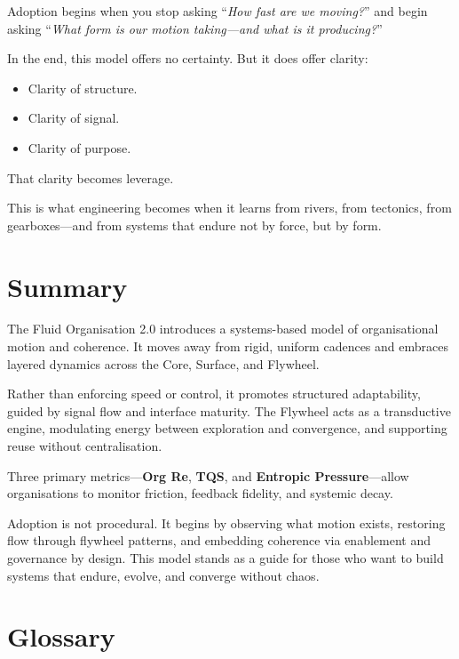 \documentclass[12pt]{article}
\begin{document}
Adoption begins when you stop asking “\textit{How fast are we moving?}” and begin asking “\textit{What form is our motion taking—and what is it producing?}”

In the end, this model offers no certainty. But it does offer clarity:
\begin{itemize}
    \item Clarity of structure.
    \item Clarity of signal.
    \item Clarity of purpose.
\end{itemize}

That clarity becomes leverage.

This is what engineering becomes when it learns from rivers, from tectonics, from gearboxes—and from systems that endure not by force, but by form.

\newpage
\section*{Summary}


The Fluid Organisation 2.0 introduces a systems-based model of organisational motion and coherence. It moves away from rigid, uniform cadences and embraces layered dynamics across the Core, Surface, and Flywheel.

Rather than enforcing speed or control, it promotes structured adaptability, guided by signal flow and interface maturity. The Flywheel acts as a transductive engine, modulating energy between exploration and convergence, and supporting reuse without centralisation.

Three primary metrics—\textbf{Org Re}, \textbf{TQS}, and \textbf{Entropic Pressure}—allow organisations to monitor friction, feedback fidelity, and systemic decay.

Adoption is not procedural. It begins by observing what motion exists, restoring flow through flywheel patterns, and embedding coherence via enablement and governance by design. This model stands as a guide for those who want to build systems that endure, evolve, and converge without chaos.

\newpage
\section*{Glossary}

\end{document}
